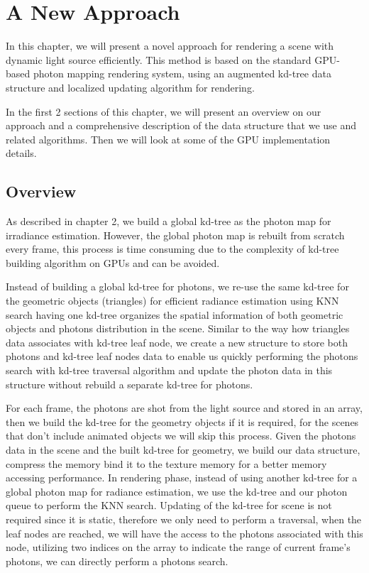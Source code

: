 \chapter{A New Approach}

In this chapter, we will present a novel approach for rendering a scene with dynamic light source efficiently. This method is based on the standard GPU-based photon mapping rendering system, using an augmented kd-tree data structure and localized updating algorithm for rendering.

In the first 2 sections of this chapter, we will present an overview on our approach and a comprehensive description of the data structure that we use and related algorithms. Then we will look at some of the GPU implementation details.

\section{Overview}

As described in chapter 2, we build a global kd-tree as the photon map for irradiance estimation. However, the global photon map is rebuilt from scratch every frame, this process is time consuming due to the complexity of kd-tree building algorithm on GPUs and can be avoided.

Instead of building a global kd-tree for photons, we re-use the same kd-tree for the geometric objects (triangles) for efficient  
radiance estimation using KNN search having one kd-tree organizes the spatial information of both geometric objects and photons distribution in the scene. Similar to the way how triangles data associates with kd-tree leaf node, we create a new structure to store both photons and kd-tree leaf nodes data to enable us quickly performing the photons search with kd-tree traversal algorithm   and update the photon data in this structure without rebuild a separate kd-tree for photons. 
 

For each frame, the photons are shot from the light source and stored in an array, then we build the kd-tree for the geometry objects if it is required, for the scenes that don't include animated objects we will skip this process. Given the photons data in the scene and the built kd-tree for geometry, we build our data structure, compress the memory bind it to the texture memory for a better memory accessing performance. 
In rendering phase, instead of using another kd-tree for a global photon map for radiance estimation, we use the kd-tree and our photon queue to perform the KNN search. Updating of the kd-tree for scene is not required since it is static, therefore we only need to perform a traversal, when the leaf nodes are reached, we will have the access to the photons associated with this node, utilizing two indices on the array to indicate the range of current frame's photons, we can directly perform a photons search. 


